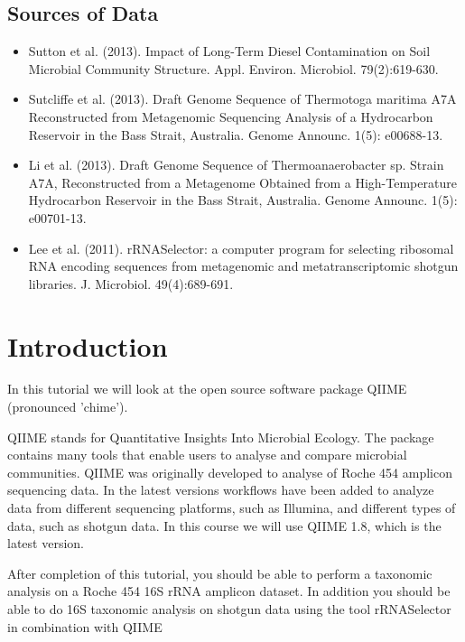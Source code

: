 \subsection{Sources of Data}
\begin{itemize}
  \item Sutton et al. (2013). Impact of Long-Term Diesel Contamination on Soil Microbial Community Structure. Appl. Environ. Microbiol. 79(2):619-630.
  \item Sutcliffe et al. (2013). Draft Genome Sequence of Thermotoga maritima A7A Reconstructed from Metagenomic Sequencing Analysis of a Hydrocarbon Reservoir in the Bass Strait, Australia. Genome Announc. 1(5): e00688-13.
  \item Li et al. (2013). Draft Genome Sequence of Thermoanaerobacter sp. Strain A7A, Reconstructed from a Metagenome Obtained from a High-Temperature Hydrocarbon Reservoir in the Bass Strait, Australia. Genome Announc. 1(5): e00701-13.
  \item Lee et al. (2011). rRNASelector: a computer program for selecting ribosomal RNA encoding sequences from metagenomic and metatranscriptomic shotgun libraries. J. Microbiol. 49(4):689-691.
\end{itemize}


\newpage


\section{Introduction}

\begin{note}
In this tutorial we will look at the open source software package QIIME (pronounced 'chime').
\end{note}

QIIME stands for Quantitative Insights Into Microbial Ecology. The package contains many tools that enable users to analyse and compare microbial communities. QIIME was originally developed to analyse of Roche 454 amplicon sequencing data. In the latest versions workflows have been added to analyze data from different sequencing platforms, such as Illumina, and different types of data, such as shotgun data. In this course we will use QIIME 1.8, which is the latest version.

After completion of this tutorial, you should be able to perform a taxonomic analysis on a Roche 454 16S rRNA amplicon dataset. In addition you should be able to do 16S taxonomic analysis on shotgun data using the tool rRNASelector in combination with QIIME

